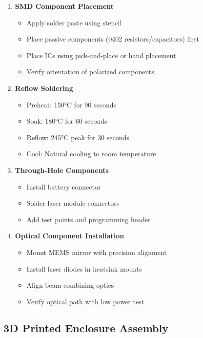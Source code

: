 \documentclass[12pt,a4paper]{article}
\begin{document}
\begin{enumerate}
\item \textbf{SMD Component Placement}
    \begin{itemize}
    \item Apply solder paste using stencil
    \item Place passive components (0402 resistors/capacitors) first
    \item Place ICs using pick-and-place or hand placement
    \item Verify orientation of polarized components
    \end{itemize}

\item \textbf{Reflow Soldering}
    \begin{itemize}
    \item Preheat: 150°C for 90 seconds
    \item Soak: 180°C for 60 seconds
    \item Reflow: 245°C peak for 30 seconds
    \item Cool: Natural cooling to room temperature
    \end{itemize}

\item \textbf{Through-Hole Components}
    \begin{itemize}
    \item Install battery connector
    \item Solder laser module connectors
    \item Add test points and programming header
    \end{itemize}

\item \textbf{Optical Component Installation}
    \begin{itemize}
    \item Mount MEMS mirror with precision alignment
    \item Install laser diodes in heatsink mounts
    \item Align beam combining optics
    \item Verify optical path with low power test
    \end{itemize}
\end{enumerate}

\subsection{3D Printed Enclosure Assembly}
\end{document}
